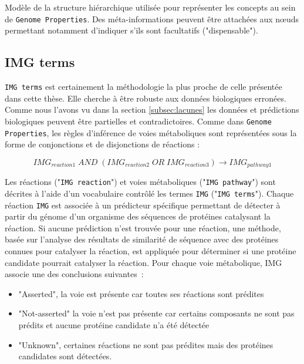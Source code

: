 \begin{refsegment}
\begin{shadedfigure}
\begin{tikzpicture}
            
        \end{tikzpicture}
        \caption{Modèle de la structure hiérarchique utilisée pour représenter les concepts au sein de \texttt{Genome Properties}. Des méta-informations peuvent être attachées aux nœuds permettant notamment d'indiquer s'ils sont facultatifs ("dispensable").  }
        \label{fig:gp_modele}
    \end{shadedfigure}
    
    \subsection{IMG terms}
    
    \texttt{IMG terms} \cite{chen2013improving} est certainement la méthodologie la plus proche de celle présentée dans cette thèse. Elle cherche à être robuste aux données biologiques erronées. Comme nous l’avons vu dans la section \ref{subsec:lacunes}  les données et prédictions biologiques peuvent être partielles et contradictoires. Comme dans \texttt{Genome Properties}, les règles d’inférence de voies métaboliques sont représentées sous la forme de conjonctions et de disjonctions de réactions :
    
    \begin{equation}
    IMG_{reaction1} \; AND \; (IMG_{reaction2} \; OR \; IMG_{reaction3} ) \to IMG_{pathway 1}
    \end{equation}
    
    Les réactions ("\texttt{IMG reaction}") et voies métaboliques ("\texttt{IMG pathway}") sont décrites à l’aide d’un vocabulaire contrôlé les termes \texttt{IMG} ("\texttt{IMG terms}"). Chaque réaction \texttt{IMG} est associée à un prédicteur spécifique permettant de détecter à partir du génome d’un organisme des séquences de protéines catalysant la réaction. Si aucune prédiction n’est trouvée pour une réaction, une méthode, basée sur l’analyse des résultats de similarité de séquence avec des protéines connues pour catalyser la réaction, est appliquée pour déterminer si une protéine candidate pourrait catalyser la réaction. Pour chaque voie métabolique, IMG associe une des conclusions suivantes :
    \begin{itemize}
        \item "Asserted", la voie est présente car toutes ses réactions sont prédites
        \item "Not-asserted" la voie n’est pas présente car certains composants ne sont pas prédits et aucune protéine candidate n’a été détectée
        \item "Unknown", certaines réactions ne sont pas prédites mais des protéines candidates sont détectées.
    \end{itemize}


\end{refsegment}
